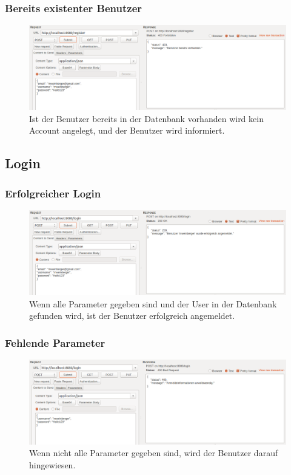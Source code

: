 \documentclass[letterpaper, 12pt]{article}
\let\tempsubsection\subsection
\renewcommand\subsection[1]{\vspace{0cm}\tempsubsection{#1}\vspace{0cm}}
\let\tempsubsubsection\subsubsection
\renewcommand\subsubsection[1]{\vspace{0cm}\tempsubsubsection{#1}\vspace{0cm}}
\begin{document}
\subsubsection{Bereits existenter Benutzer}
\begin{figure}[h]
	\includegraphics[width=1\textwidth]{images/reg_vorh}
	\caption{Ist der Benutzer bereits in der Datenbank vorhanden wird kein Account angelegt, und der Benutzer wird informiert.}
\end{figure}
\clearpage

\subsection{Login}
\subsubsection{Erfolgreicher Login}
\begin{figure}[h]
	\includegraphics[width=1\textwidth]{images/login_erf}
	\caption{Wenn alle Parameter gegeben sind und der User in der Datenbank gefunden wird, ist der Benutzer erfolgreich angemeldet.}
\end{figure}

\subsubsection{Fehlende Parameter}
\begin{figure}[h]
	\includegraphics[width=1\textwidth]{images/login_unv}
	\caption{Wenn nicht alle Parameter gegeben sind, wird der Benutzer darauf hingewiesen.}
\end{figure}
\clearpage
\end{document}

